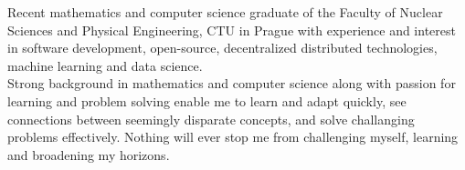 \documentclass[9pt]{developercv} %
\begin{document}
\vspace{0.5cm}



\begin{minipage}[t]{1\textwidth} %
	\vspace{-\baselineskip} %
Recent mathematics and computer science graduate of the Faculty of Nuclear Sciences and Physical Engineering, CTU in Prague with experience and interest in software development, open-source, decentralized distributed technologies, machine learning and data science.\\

Strong background in mathematics and computer science along with passion for learning and problem solving enable me to learn and adapt quickly, see connections between seemingly disparate concepts, and solve challanging problems effectively. Nothing will ever stop me from challenging myself, learning and broadening my horizons.

\end{minipage}
\hfill %

   \begin{center}
    \end{center}

\end{document}
